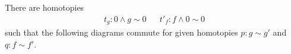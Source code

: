 \documentclass{article}
\newcommand{\smsh}{\wedge}
\begin{document}
\begin{lem}\label{lem:smash-zero}
	There are homotopies 
	\begin{align*}
	t_g : 0\smsh g\sim 0 && t'_f : f\smsh0\sim0
	\end{align*}
	such that the following diagrams
    commute for given homotopies $p : g\sim g'$ and $q : f\sim f'$.
    \begin{center}
\qquad\qquad
{}
\end{center}
\end{lem}
\end{document}
